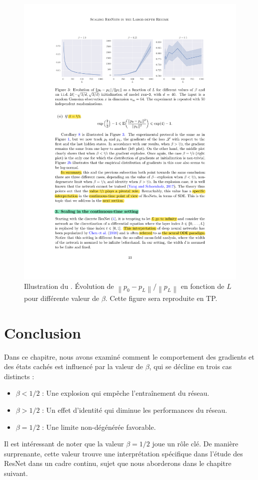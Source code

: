 \begin{figure}[H]
    \centering
    \includegraphics[width=.95\textwidth]{figs/figure_cor8.pdf}
    \caption{Illustration du . Évolution de $ \left\| p_0 - p_L \right\| / \left\| p_L \right\| $ en fonction de $ L $ pour différente valeur de $ \beta  $. Cette figure sera reproduite en TP.}
    \label{fig:cor8}
\end{figure}

\section{Conclusion}\label{ccl_chap2}
Dans ce chapitre, nous avons examiné comment le comportement des gradients et des états cachés est influencé par la valeur de $\beta$, qui se décline en trois cas distincts :
\begin{itemize}
    \item $\beta < 1/2$ : Une explosion qui empêche l'entraînement du réseau.
    \item $\beta > 1/2$ : Un effet d'identité qui diminue les performances du réseau.
    \item $\beta = 1/2$ : Une limite non-dégénérée favorable.
\end{itemize}
Il est intéressant de noter que la valeur $\beta = 1/2$ joue un rôle clé. De manière surprenante, cette valeur trouve une interprétation spécifique dans l'étude des ResNet dans un cadre continu, sujet que nous aborderons dans le chapitre suivant.
